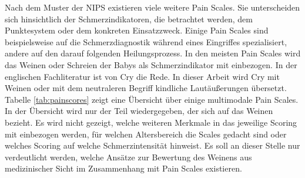 Nach dem Muster der NIPS existieren viele weitere Pain Scales. Sie unterscheiden sich hinsichtlich der Schmerzindikatoren, die betrachtet werden, dem Punktesystem oder dem konkreten Einsatzzweck. Einige Pain Scales sind beispielsweise auf die Schmerzdiagnostik während eines Eingriffes spezialisiert, andere auf den darauf folgenden Heilungsprozess. In den meisten Pain Scales wird das Weinen oder Schreien der Babys als Schmerzindikator mit einbezogen. In der englischen Fachliteratur ist von \glqq Cry\grqq{} die Rede.\cite[S. 97 - 98]{painInNeonates} In dieser Arbeit wird \glqq Cry\grqq{} mit \glqq Weinen\grqq{} oder mit dem neutraleren Begriff \glqq kindliche Lautäußerungen\grqq{} übersetzt. Tabelle \ref{tab:painscores} zeigt eine Übersicht über einige multimodale Pain Scales. In der Übersicht wird nur der Teil wiedergegeben, der sich auf das Weinen bezieht. Es wird nicht gezeigt, welche weiteren Merkmale in das jeweilige Scoring mit einbezogen werden, für welchen Altersbereich die Scales gedacht sind oder welches Scoring auf welche Schmerzintensität hinweist. Es soll an dieser Stelle nur verdeutlicht werden, welche Ansätze zur Bewertung des Weinens aus medizinischer Sicht im Zusammenhang mit Pain Scales existieren. 

